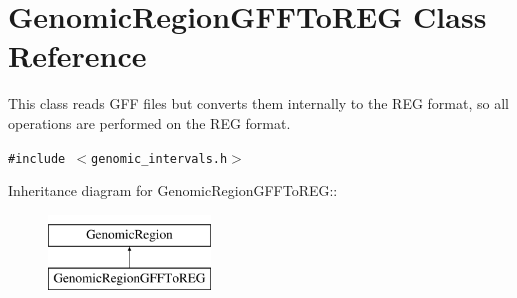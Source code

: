 \hypertarget{classGenomicRegionGFFToREG}{
\section{GenomicRegionGFFToREG Class Reference}
\label{classGenomicRegionGFFToREG}
}
This class reads GFF files but converts them internally to the REG format, so all operations are performed on the REG format.  


{\tt \#include $<$genomic\_\-intervals.h$>$}

Inheritance diagram for GenomicRegionGFFToREG::\begin{figure}[H]
\begin{center}
\leavevmode
\includegraphics[height=2cm]{classGenomicRegionGFFToREG}
\end{center}
\end{figure}
